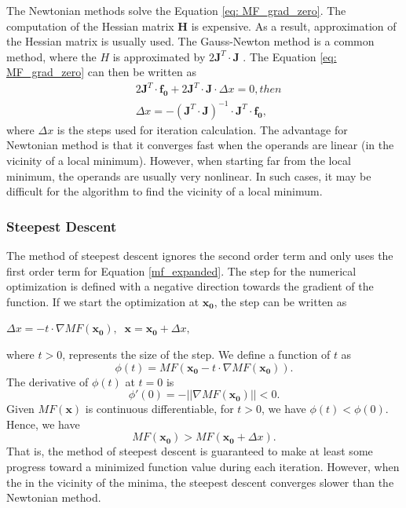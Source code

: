 The Newtonian methods solve the Equation \ref{eq: MF_grad_zero}. The computation of the Hessian matrix $\pmb{H}$ is expensive. As a result, approximation of the Hessian matrix is usually used. The Gauss-Newton method is a common method, where the $H$ is approximated by $2\pmb{J}^T \cdot \pmb{J}$ . The Equation \ref{eq: MF_grad_zero} can then be written as 
\begin{equation} \label{eq: gauss-newton}
\begin{split}
&2 \pmb{J}^{T} \cdot \pmb{f_0} + 2\pmb{J}^T \cdot \pmb{J} \cdot \Delta x = 0 ,  then\\
&\Delta x = - (\pmb{J}^T \cdot \pmb{J} )^{-1} \cdot \pmb{J}^{T} \cdot \pmb{f_0},
\end{split}
\end{equation}
where $\Delta x$ is the steps used for iteration calculation. 
The advantage for Newtonian method is that it converges fast when the operands are linear (in the vicinity of a local minimum). However, when starting far from the local minimum, the operands are usually very nonlinear. In such cases, it may be difficult for the algorithm to find the vicinity of a local minimum. 
\newline

\subsubsection{Steepest Descent}

The method of steepest descent  ignores the second order term and only uses the first order term for  Equation \ref{mf_expanded}. The step for the numerical optimization is defined with a negative direction towards the gradient of the function. If we start the optimization at $\pmb{x_0}$, the step can be written as
\medskip
\newline
\begin{center}
$
\Delta x = - t \cdot \nabla MF(\pmb{x_0}), \;\; \pmb{x} = \pmb{x_0} + \Delta x,
$
\end{center}
\medskip
where $t>0$, represents the size of the step. We define a function of $t$ as 
\begin{equation} \label{eq: function of t}
\phi(t) = MF(\pmb{x_0} - t \cdot \nabla MF(\pmb{x_0})).
\end{equation}The derivative of $\phi(t)$ at $t=0$ is
\begin{equation}\label{t=0}
\phi'(0) = - \vert\vert \nabla MF(\pmb{x_0}) \vert \vert < 0.
\end{equation}Given $MF(\pmb{x})$ is continuous differentiable, for $t>0$, we have $\phi(t) < \phi(0)$. Hence, we have
\begin{equation}
MF(\pmb{x_0}) > MF(\pmb{x_0} + \Delta x).
\end{equation}That is, the method of steepest descent is guaranteed to make at least some progress toward a minimized function value during each iteration. However, when the in the vicinity of the minima, the steepest descent converges slower than the Newtonian method.
\newline


